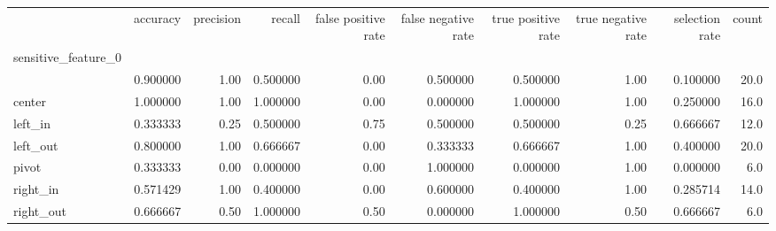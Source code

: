 \begin{tabular}{lrrrrrrrrr}
\toprule
{} &  accuracy &  precision &    recall &  false positive rate &  false negative rate &  true positive rate &  true negative rate &  selection rate &  count \\
sensitive\_feature\_0 &           &            &           &                      &                      &                     &                     &                 &        \\
\midrule
                    &  0.900000 &       1.00 &  0.500000 &                 0.00 &             0.500000 &            0.500000 &                1.00 &        0.100000 &   20.0 \\
center              &  1.000000 &       1.00 &  1.000000 &                 0.00 &             0.000000 &            1.000000 &                1.00 &        0.250000 &   16.0 \\
left\_in             &  0.333333 &       0.25 &  0.500000 &                 0.75 &             0.500000 &            0.500000 &                0.25 &        0.666667 &   12.0 \\
left\_out            &  0.800000 &       1.00 &  0.666667 &                 0.00 &             0.333333 &            0.666667 &                1.00 &        0.400000 &   20.0 \\
pivot               &  0.333333 &       0.00 &  0.000000 &                 0.00 &             1.000000 &            0.000000 &                1.00 &        0.000000 &    6.0 \\
right\_in            &  0.571429 &       1.00 &  0.400000 &                 0.00 &             0.600000 &            0.400000 &                1.00 &        0.285714 &   14.0 \\
right\_out           &  0.666667 &       0.50 &  1.000000 &                 0.50 &             0.000000 &            1.000000 &                0.50 &        0.666667 &    6.0 \\
\bottomrule
\end{tabular}
